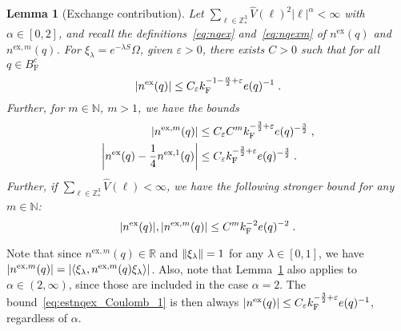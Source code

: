 \documentclass[12pt,a4paper]{article}
\numberwithin{equation}{section}
\newcommand{\NNN}{\mathbb{N}}
\newcommand{\1}{\mathbb{I}}
\newcommand{\ex}{\mathrm{ex}}
\newcommand{\F}{\mathrm{F}}
\newcommand{\Z}{\mathbb{Z}}
\newcommand{\eva}[1]{\left\langle #1 \right\rangle}
\theoremstyle{plain}
\newtheorem{lemma}[theorem]{Lemma}
\theoremstyle{definition}
\theoremstyle{remark}
\theoremstyle{plain}
\theoremstyle{definition}
\theoremstyle{remark}
\begin{document}
\begin{lemma}[Exchange contribution] \label{lem:estnqex}
Let $ \sum_{\ell \in \Z^3_*} \hat{V}(\ell)^2 |\ell|^\alpha < \infty $ with $ \alpha \in [0,2] $, and recall the definitions~\eqref{eq:nqex} and~\eqref{eq:nqexm} of $ n^{\ex}(q) $ and $ n^{\ex,m}(q) $. For $\xi_\lambda = e^{-\lambda S} \Omega$, given $ \varepsilon > 0 $, there exists $ C > 0 $ such that for all $ q \in B_{\F}^c $\todo{Also do $ q \in B_{\F} $.}
\begin{equation}
	\abs{n^{\ex}(q)}
	\leq C_\varepsilon k_{\F}^{-1 - \frac{\alpha}{2} + \varepsilon} e(q)^{-1} \;. \label{eq:estnqex_Coulomb_1}
\end{equation}
Further, for $ m \in \NNN $, $ m > 1 $, we have the bounds
\begin{equation}
\begin{aligned}
	\abs{n^{\ex,m}(q)}
	&\leq C_\varepsilon C^m k_{\F}^{-\frac 32 + \varepsilon} e(q)^{-\frac 32} \;, \\
	\abs{n^{\ex}(q) - \frac 14 n^{\ex,1}(q)}
	&\leq C_\varepsilon k_{\F}^{-\frac 32 + \varepsilon} e(q)^{-\frac 32} \;. \label{eq:estnqex_Coulomb}
\end{aligned}
\end{equation}
Further, if $ \sum_{\ell \in \Z^3_*} \hat{V}(\ell) < \infty $, we have the following stronger bound for any $ m \in \mathbb{N} $:
\begin{equation}
	\abs{n^{\ex}(q)},
	\abs{n^{\ex,m}(q)}
	\leq C^m k_{\F}^{-2} e(q)^{-2} \;. \label{eq:estnqex}
\end{equation}
\end{lemma}

Note that since $ n^{\ex,m}(q) \in \mathbb{R} $ and $ \norm{\xi_\lambda} = 1 $ for any $ \lambda \in [0,1] $, we have $ |n^{\ex,m}(q)| =  \abs{\eva{\xi_\lambda, n^{\ex,m}(q) \xi_\lambda }} $. Also, note that Lemma~\ref{lem:estnqex} also applies to $ \alpha \in (2,\infty) $, since those are included in the case $ \alpha = 2 $. The bound~\eqref{eq:estnqex_Coulomb_1} is then always $ \abs{n^{\ex}(q)} \leq C_\varepsilon k_{\F}^{-\frac 32 + \varepsilon} e(q)^{-1} $, regardless of $ \alpha $.
\end{document}
